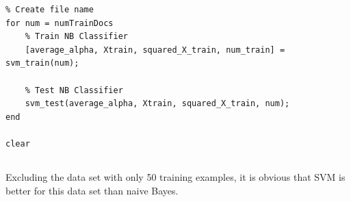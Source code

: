 \documentclass[11pt,a4paper,titlepage]{article}
\begin{document}
{{\begin{verbatim}
% Create file name
for num = numTrainDocs
    % Train NB Classifier
    [average_alpha, Xtrain, squared_X_train, num_train] = svm_train(num);

    % Test NB Classifier
    svm_test(average_alpha, Xtrain, squared_X_train, num);
end

clear
\end{verbatim}
}\label{prob:3d}
\subsection{}{
Excluding the data set with only 50 training examples, it is obvious that SVM is better for this data set than naive Bayes.
}\label{prob:3e}
}\label{problem 3}
\end{document}

